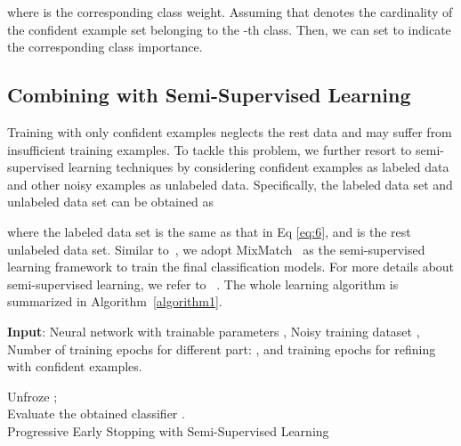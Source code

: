 \documentclass[11pt]{article}
\begin{document}
\indent where  is the corresponding class weight. Assuming that   denotes  the cardinality of the confident example  set belonging to the -th class. Then, we can set  to indicate the corresponding class importance.


\subsection{Combining with Semi-Supervised Learning}
\label{sec:2.3}
Training with only confident examples neglects the rest data and may suffer from insufficient training examples. To tackle this problem, we further resort to semi-supervised learning techniques by considering confident examples as labeled data and other noisy examples as unlabeled data. Specifically, the labeled data set and unlabeled data set can be obtained as

\indent where the labeled data set  is the same as that in Eq \eqref{eq:6}, and  is the rest unlabeled data set. Similar to~\cite{Li2020DivideMix}, we adopt MixMatch~\cite{Berthelot2019MixMatch} as the semi-supervised learning framework to train the final classification models. For more details about semi-supervised learning, we refer to ~\cite{Berthelot2019MixMatch}. The whole learning algorithm is summarized in Algorithm~\ref{algorithm1}.


\begin{algorithm}[!tp]
{\bfseries Input}:  Neural network with trainable parameters , Noisy training dataset , Number of training epochs for different part: , and training epochs  for refining with confident examples.


Unfroze ;\\

     {Evaluate} the obtained classifier . \\
\caption{Progressive Early Stopping with Semi-Supervised Learning}
\label{algorithm1}
\end{algorithm}
\end{document}
